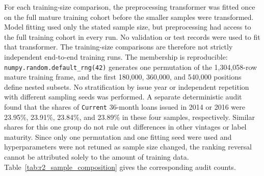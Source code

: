 \documentclass[10pt]{article}
\begin{document}
For each training-size comparison, the preprocessing transformer was fitted once on the full mature training cohort before the smaller samples were transformed. Model fitting used only the stated sample size, but preprocessing had access to the full training cohort in every run. No validation or test records were used to fit that transformer. The training-size comparisons are therefore not strictly independent end-to-end training runs. The membership is reproducible: \texttt{numpy.random.default\_rng(42)} generates one permutation of the 1,304,058-row mature training frame, and the first 180,000, 360,000, and 540,000 positions define nested subsets. No stratification by issue year or independent repetition with different sampling seeds was performed. A separate deterministic audit found that the shares of \texttt{Current} 36-month loans issued in 2014 or 2016 were 23.95\%, 23.91\%, 23.84\%, and 23.89\% in these four samples, respectively. Similar shares for this one group do not rule out differences in other vintages or label maturity. Since only one permutation and one fitting seed were used and hyperparameters were not retuned as sample size changed, the ranking reversal cannot be attributed solely to the amount of training data. Table~\ref{tab:r2_sample_composition} gives the corresponding audit counts.
\end{document}
